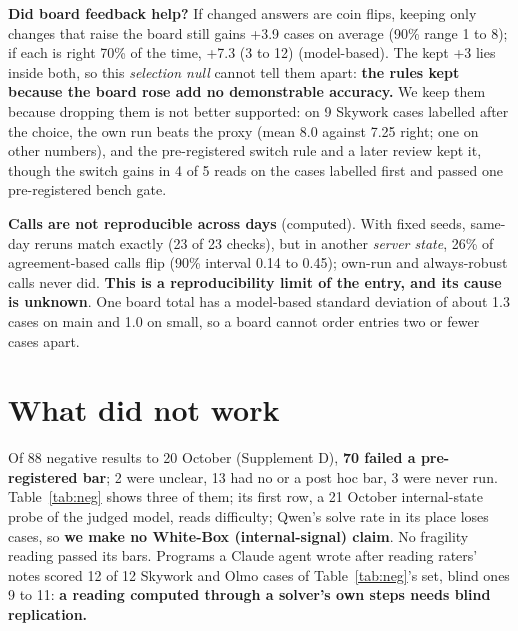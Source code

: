 \documentclass{article}
\begin{document}
\textbf{Did board feedback help?} If changed answers are coin flips, keeping only changes that raise the board still
gains +3.9 cases on average (90\% range 1 to 8); if each is right 70\% of the time, +7.3 (3 to 12) (model-based). The
kept +3 lies inside both, so this \emph{selection null} \citep{dwork2015,blum2015,roelofs2019} cannot tell them apart:
\textbf{the rules kept because the board rose add no demonstrable accuracy.} We keep them because dropping them is not
better supported: on 9 Skywork cases labelled after the choice, the own run beats the proxy (mean 8.0 against 7.25
right; one on other numbers), and the pre-registered switch rule and a later review kept it, though the switch gains
in 4 of 5 reads on the cases labelled first and passed one pre-registered bench gate.

\textbf{Calls are not reproducible across days} (computed). With fixed seeds, same-day reruns match exactly (23 of 23
checks), but in another \emph{server state}, 26\% of agreement-based calls flip (90\% interval 0.14 to 0.45); own-run
and always-robust calls never did. \textbf{This is a reproducibility limit of the entry, and its cause is unknown}. One
board total has a model-based standard deviation of about 1.3 cases on main and 1.0 on small, so a board cannot order
entries two or fewer cases apart.

\section{What did not work}
\label{sec:neg}

Of 88 negative results to 20 October (Supplement D), \textbf{70 failed a pre-registered bar}; 2 were unclear, 13 had
no or a post hoc bar, 3 were never run. Table~\ref{tab:neg} shows three of them; its first row, a 21 October
internal-state probe of the judged model, reads difficulty; Qwen's solve rate in its place loses cases, so \textbf{we
make no White-Box (internal-signal) claim}. No fragility reading passed its bars. Programs a Claude agent wrote after
reading raters' notes scored 12 of 12 Skywork and Olmo cases of Table~\ref{tab:neg}'s set, blind ones 9 to 11:
\textbf{a reading computed through a solver's own steps needs blind replication.}
\end{document}
